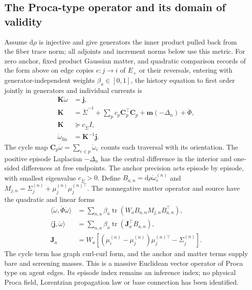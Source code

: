 \subsection{The Proca-type operator and its domain of validity}
\label{sec:latent_link_proca}

Assume $\mathrm d\rho$ is injective and give generators the inner product pulled back
from the fiber trace norm; all adjoints and increment norms below use this metric.
For zero anchor, fixed product Gaussian matter, and quadratic comparison records of the
form above on edge copies $e:j\to i$ of $E_+$ or their reversals, entering with
generator-independent weights $\beta_a\in[0,1]$, the history equation to
first order jointly in generators and individual currents is
\begin{equation}
\boxed{\begin{aligned}
\mathbf K\mathring\omega&=\mathbf j,\\
\mathbf K&=\mathring\Sigma^{-1}+\sum_p c_p\mathbf C_p^\top\mathbf C_p
+\mathbf m(-\Delta_n)+\mathring\Phi,\\
\mathbf K&\succeq c_{\mathring\Sigma}I,\\
\mathring\omega_{\mathrm{lin}}&=\mathbf K^{-1}\mathbf j.
\end{aligned}}
\label{eq:latent_link_proca}
\end{equation}
The cycle map $\mathbf C_p\mathring\omega=\sum_{e\in p}\mathring\omega_e$ counts each
traversal with its orientation. The positive episode Laplacian $-\Delta_n$ has the
central difference in the interior and one-sided differences at free endpoints.
The anchor precision acts episode by episode, with smallest eigenvalue
$c_{\mathring\Sigma}>0$. Define $B_{a,n}=\mathrm d\rho\mathring\omega_e^{(n)}$ and
$M_{j,n}=\Sigma_j^{(n)}+\mu_j^{(n)}\mu_j^{(n)\top}$. The nonnegative matter operator
and source have the quadratic and linear forms
\begin{equation}
\begin{aligned}
\langle\mathring\omega,\mathring\Phi\mathring\omega\rangle
&=\sum_{n,a}\beta_a\operatorname{tr}(W_aB_{a,n}M_{j,n}B_{a,n}^\top),\\
\langle\mathbf j,\mathring\omega\rangle
&=\sum_{n,a}\beta_a\operatorname{tr}(\mathbf J_a^\top B_{a,n}),\\
\mathbf J_a&=W_a[(\mu_i^{(n)}-\mu_j^{(n)})\mu_j^{(n)\top}-\Sigma_j^{(n)}].
\end{aligned}
\label{eq:latent_link_matter_operator}
\end{equation}
The cycle term has graph curl-curl form, and the anchor and matter terms supply bare and
screening masses. This is a massive Euclidean vector operator of Proca type on agent
edges. Its episode index remains an inference index; no physical Proca field, Lorentzian
propagation law or base connection has been identified.

